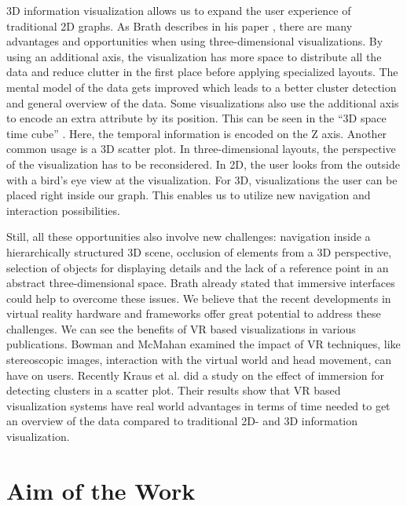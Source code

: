 3D information visualization allows us to expand the user experience of traditional 2D graphs. As Brath describes in his paper \cite{brath_3d_2014}, there are many advantages and opportunities when using three-dimensional visualizations.
By using an additional axis, the visualization has more space to distribute all the data and reduce clutter in the first place before applying specialized layouts. The mental model of the data gets improved which leads to a better cluster detection and general overview of the data. 
Some visualizations also use the additional axis to encode an extra attribute by its position. This can be seen in the “3D space time cube” \cite{brath_3d_2014}. Here, the temporal information is encoded on the Z axis. Another common usage is a 3D scatter plot.
In three-dimensional layouts, the perspective of the visualization has to be reconsidered. In 2D, the user looks from the outside with a bird's eye view at the visualization. For 3D, visualizations the user can be placed right inside our graph. This enables us to utilize new navigation and interaction possibilities.

Still, all these opportunities also involve new challenges: navigation inside a hierarchically structured 3D scene, occlusion of elements from a 3D perspective, selection of objects for displaying details and the lack of a reference point in an abstract three-dimensional space. Brath \cite{brath_3d_2014} already stated that immersive interfaces could help to overcome these issues.\label{chap:advantages_VR}
We believe that the recent developments in virtual reality hardware and frameworks offer great potential to address these challenges. 
We can see the benefits of VR based visualizations in various publications. Bowman and McMahan \cite{bowman_virtual_2007} examined the impact of VR techniques, like stereoscopic images, interaction with the virtual world and head movement, can have on users. 
Recently Kraus et al. \cite{kraus_impact_2020} did a study on the effect of immersion for detecting clusters in a scatter plot. Their results show that VR based visualization systems have real world advantages in terms of time needed to get an overview of the data compared to traditional 2D- and 3D information visualization. 
 
\section{Aim of the Work}

